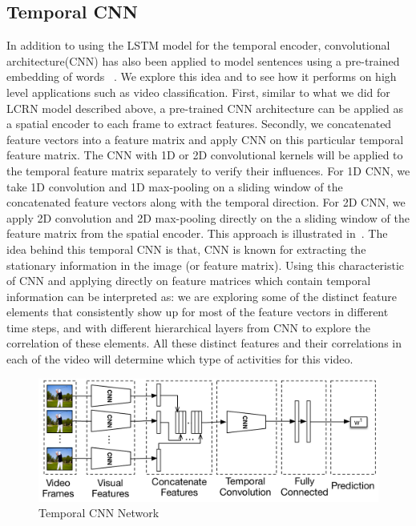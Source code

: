 
\subsection{Temporal CNN}
In addition to using the LSTM model for the temporal encoder, convolutional architecture(CNN) has also been applied to model sentences using a pre-trained embedding of words ~\cite{cnnSC,cnnMNLS}. We explore this idea and to see how it performs on high level applications such as video classification. First, similar to what we did for LCRN model described above, a pre-trained CNN architecture can be applied as a spatial encoder to each frame to extract features. 
Secondly, we concatenated feature vectors into a feature matrix and apply CNN on this particular temporal feature matrix. The CNN with 1D or 2D convolutional kernels will be applied to the temporal feature matrix separately to verify their influences. For 1D CNN, we take 1D convolution and 1D max-pooling on a sliding window of the concatenated feature vectors along with the temporal direction. For 2D CNN, we apply 2D convolution and 2D max-pooling directly on the a sliding window of the feature matrix from the spatial encoder. This approach is illustrated in~.
The idea behind this temporal CNN is that, CNN is known for extracting the stationary information in the image (or feature matrix). Using this characteristic of CNN and applying directly on feature matrices which contain temporal information can be interpreted as: we are exploring some of the distinct feature elements that consistently show up for most of the feature vectors in different time steps, and with different hierarchical layers from CNN to explore the correlation of these elements. All these distinct features and their correlations in each of the video will determine which type of activities for this video. 

\begin{figure}
  \centering
  \includegraphics[width=1.0\linewidth]{figs/tnn}
  \caption{Temporal CNN Network}
  \label{fig:tnn}
\end{figure}

